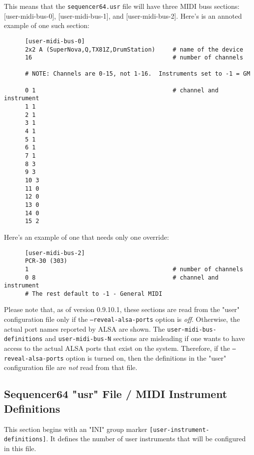    This means that the \texttt{sequencer64.usr} file will have three MIDI buss
   sections: [user-midi-bus-0], [user-midi-bus-1], and [user-midi-bus-2].
   Here's is an annoted example of one such section:

   \begin{verbatim}
      [user-midi-bus-0]
      2x2 A (SuperNova,Q,TX81Z,DrumStation)     # name of the device
      16                                        # number of channels

      # NOTE: Channels are 0-15, not 1-16.  Instruments set to -1 = GM

      0 1                                       # channel and instrument
      1 1 
      2 1
      3 1
      4 1
      5 1
      6 1
      7 1
      8 3
      9 3
      10 3
      11 0
      12 0
      13 0
      14 0
      15 2
   \end{verbatim}

   Here's an example of one that needs only one override:

   \begin{verbatim}
      [user-midi-bus-2]
      PCR-30 (303)
      1                                         # number of channels
      0 8                                       # channel and instrument
      # The rest default to -1 - General MIDI
   \end{verbatim}

   Please note that, as of version 0.9.10.1, these sections are read from the
   "user" configuration file only if
   the \texttt{--reveal-alsa-ports} option is \textsl{off}.
   Otherwise, the actual port names reported by ALSA are shown.
   The \texttt{user-midi-bus-definitions} and \texttt{user-midi-bus-N} sections
   are misleading if one wants to have access to the
   actual ALSA ports that exist on the system.
   Therefore, if the \texttt{--reveal-alsa-ports} option is turned on, then the
   definitions in the "user" configuration file are \textsl{not} read from that
   file.

\subsection{Sequencer64 "usr" File / MIDI Instrument Definitions}
\label{subsec:seq64_usr_file_midi_instrument_definitions}

   This section begins with an
   "INI" group marker \texttt{[user-instrument-definitions]}.
   It defines the number of user instruments that will be configured in this
   file.


